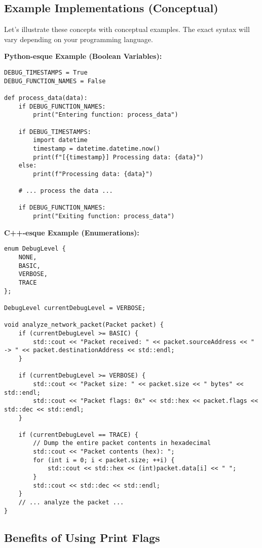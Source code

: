 \documentclass{article}
\begin{document}
{{{\subsection*{Example Implementations (Conceptual)}

Let's illustrate these concepts with conceptual examples.  The exact syntax will vary depending on your programming language.

\textbf{Python-esque Example (Boolean Variables):}

\begin{verbatim}
DEBUG_TIMESTAMPS = True
DEBUG_FUNCTION_NAMES = False

def process_data(data):
    if DEBUG_FUNCTION_NAMES:
        print("Entering function: process_data")

    if DEBUG_TIMESTAMPS:
        import datetime
        timestamp = datetime.datetime.now()
        print(f"[{timestamp}] Processing data: {data}")
    else:
        print(f"Processing data: {data}")

    # ... process the data ...

    if DEBUG_FUNCTION_NAMES:
        print("Exiting function: process_data")
\end{verbatim}

\textbf{C++-esque Example (Enumerations):}

\begin{verbatim}
enum DebugLevel {
    NONE,
    BASIC,
    VERBOSE,
    TRACE
};

DebugLevel currentDebugLevel = VERBOSE;

void analyze_network_packet(Packet packet) {
    if (currentDebugLevel >= BASIC) {
        std::cout << "Packet received: " << packet.sourceAddress << " -> " << packet.destinationAddress << std::endl;
    }

    if (currentDebugLevel >= VERBOSE) {
        std::cout << "Packet size: " << packet.size << " bytes" << std::endl;
        std::cout << "Packet flags: 0x" << std::hex << packet.flags << std::dec << std::endl;
    }

    if (currentDebugLevel == TRACE) {
        // Dump the entire packet contents in hexadecimal
        std::cout << "Packet contents (hex): ";
        for (int i = 0; i < packet.size; ++i) {
            std::cout << std::hex << (int)packet.data[i] << " ";
        }
        std::cout << std::dec << std::endl;
    }
    // ... analyze the packet ...
}
\end{verbatim}

\subsection*{Benefits of Using Print Flags}

}}}
\end{document}
